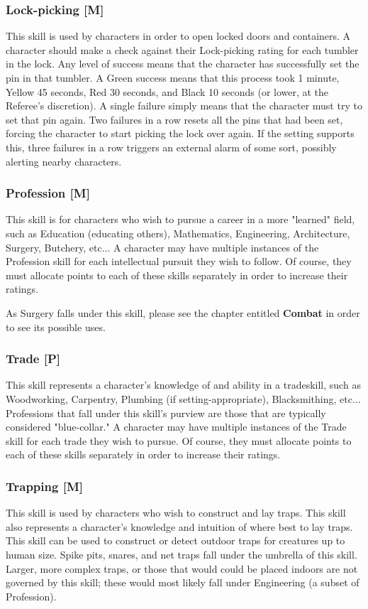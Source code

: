\documentclass[oneside]{book}
\begin{document}
\begin{multicols}{2}
\subsubsection{Lock-picking [M]}
This skill is used by characters in order to open locked doors and containers. A character should make a check against their Lock-picking rating for each tumbler in the lock. Any level of success means that the character has successfully set the pin in that tumbler. A Green success means that this process took 1 minute, Yellow 45 seconds, Red 30 seconds, and Black 10 seconds (or lower, at the Referee's discretion). A single failure simply means that the character must try to set that pin again. Two failures in a row resets all the pins that had been set, forcing the character to start picking the lock over again. If the setting supports this, three failures in a row triggers an external alarm of some sort, possibly alerting nearby characters.

\subsubsection{Profession [M]}
This skill is for characters who wish to pursue a career in a more "learned" field, such as Education (educating others), Mathematics, Engineering, Architecture, Surgery, Butchery, etc... A character may have multiple instances of the Profession skill for each intellectual pursuit they wish to follow. Of course, they must allocate points to each of these skills separately in order to increase their ratings. 

As Surgery falls under this skill, please see the chapter entitled \textbf{Combat} in order to see its possible uses. 


\subsubsection{Trade [P]}
This skill represents a character's knowledge of and ability in a tradeskill, such as Woodworking, Carpentry, Plumbing (if setting-appropriate), Blacksmithing, etc... Professions that fall under this skill's purview are those that are typically considered "blue-collar."  A character may have multiple instances of the Trade skill for each trade they wish to pursue. Of course, they must allocate points to each of these skills separately in order to increase their ratings. 

\subsubsection{Trapping [M]}
This skill is used by characters who wish to construct and lay traps. This skill also represents a character's knowledge and intuition of where best to lay traps. This skill can be used to construct or detect outdoor traps for creatures up to human size. Spike pits, snares, and net traps fall under the umbrella of this skill. Larger, more complex traps, or those that would could be placed indoors are not governed by this skill; these would most likely fall under Engineering (a subset of Profession).


\end{multicols}
\end{document}
